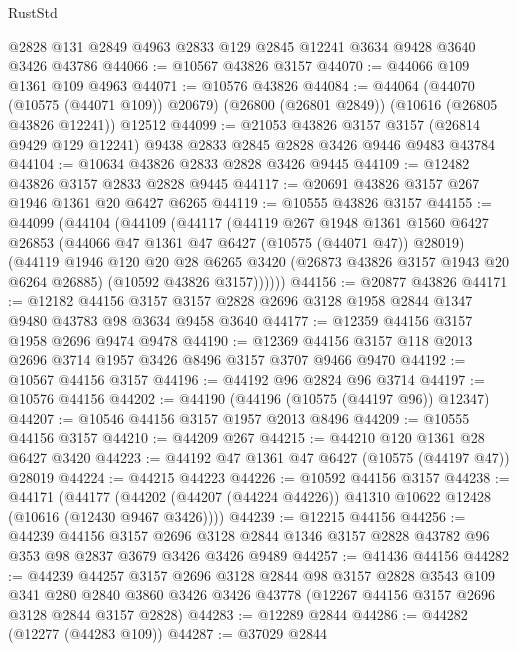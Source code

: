 \begin{lexlean}{RustStd}
\begin{coremodule}
    @2828
    @131
    @2849
    @4963
    @2833
    @129
    @2845
    @12241
    @3634
    @9428
    @3640
    @3426
    @43786
@44066 := @10567 @43826 @3157
@44070 := @44066 @109 @1361 @109 @4963
@44071 := @10576 @43826
@44084 := @44064
    (@44070 (@10575 (@44071 @109)) @20679)
    (@26800 (@26801 @2849))
    (@10616 (@26805 @43826 @12241))
    @12512
@44099 := @21053
    @43826
    @3157
    @3157
    (@26814 @9429 @129 @12241)
    @9438
    @2833
    @2845
    @2828
    @3426
    @9446
    @9483
    @43784
@44104 := @10634 @43826 @2833 @2828 @3426 @9445
@44109 := @12482 @43826 @3157 @2833 @2828 @9445
@44117 := @20691 @43826 @3157 @267 @1946 @1361 @20 @6427 @6265
@44119 := @10555 @43826 @3157
@44155 := @44099
    (@44104
      (@44109
        (@44117
          (@44119
            @267
            @1948
            @1361
            @1560
            @6427
            @26853
            (@44066 @47 @1361 @47 @6427 (@10575 (@44071 @47)) @28019)
            (@44119
              @1946
              @120
              @20
              @28
              @6265
              @3420
              (@26873 @43826 @3157 @1943 @20 @6264 @26885)
              (@10592 @43826 @3157))))))
@44156 := @20877 @43826
@44171 := @12182
    @44156
    @3157
    @3157
    @2828
    @2696
    @3128
    @1958
    @2844
    @1347
    @9480
    @43783
    @98
    @3634
    @9458
    @3640
@44177 := @12359 @44156 @3157 @1958 @2696 @9474 @9478
@44190 := @12369 @44156 @3157 @118 @2013 @2696 @3714 @1957 @3426 @8496 @3157 @3707 @9466 @9470
@44192 := @10567 @44156 @3157
@44196 := @44192 @96 @2824 @96 @3714
@44197 := @10576 @44156
@44202 := @44190 (@44196 (@10575 (@44197 @96)) @12347)
@44207 := @10546 @44156 @3157 @1957 @2013 @8496
@44209 := @10555 @44156 @3157
@44210 := @44209 @267
@44215 := @44210 @120 @1361 @28 @6427 @3420
@44223 := @44192 @47 @1361 @47 @6427 (@10575 (@44197 @47)) @28019
@44224 := @44215 @44223
@44226 := @10592 @44156 @3157
@44238 := @44171
    (@44177 (@44202 (@44207 (@44224 @44226)) @41310 @10622 @12428 (@10616 (@12430 @9467 @3426))))
@44239 := @12215 @44156
@44256 := @44239
    @44156
    @3157
    @2696
    @3128
    @2844
    @1346
    @3157
    @2828
    @43782
    @96
    @353
    @98
    @2837
    @3679
    @3426
    @3426
    @9489
@44257 := @41436 @44156
@44282 := @44239
    @44257
    @3157
    @2696
    @3128
    @2844
    @98
    @3157
    @2828
    @3543
    @109
    @341
    @280
    @2840
    @3860
    @3426
    @3426
    @43778
    (@12267 @44156 @3157 @2696 @3128 @2844 @3157 @2828)
@44283 := @12289 @2844
@44286 := @44282 (@12277 (@44283 @109))
@44287 := @37029 @2844

\end{coremodule}
\end{lexlean}
